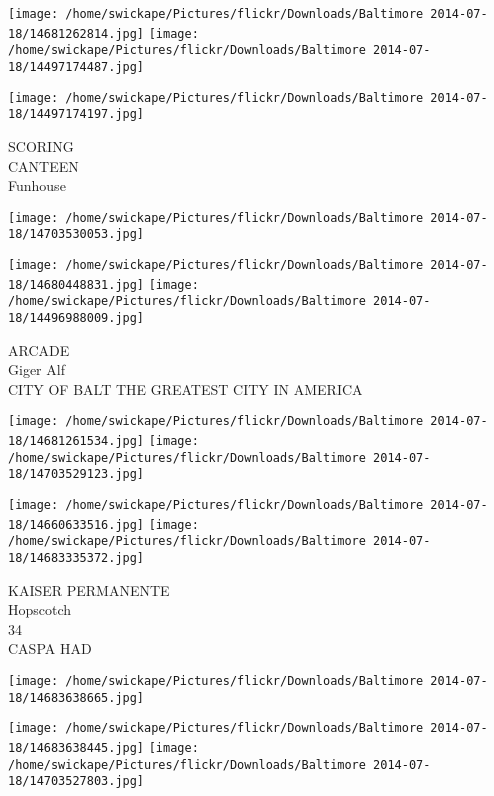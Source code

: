\documentclass[10pt,letterpaper]{article}
\begin{document}
\texttt{[image: /home/swickape/Pictures/flickr/Downloads/Baltimore 2014-07-18/14681262814.jpg]}
\texttt{[image: /home/swickape/Pictures/flickr/Downloads/Baltimore 2014-07-18/14497174487.jpg]}

\texttt{[image: /home/swickape/Pictures/flickr/Downloads/Baltimore 2014-07-18/14497174197.jpg]}

SCORING\\
CANTEEN\\
Funhouse\\
\pagebreak

\texttt{[image: /home/swickape/Pictures/flickr/Downloads/Baltimore 2014-07-18/14703530053.jpg]}

\vspace{0.25in}
\texttt{[image: /home/swickape/Pictures/flickr/Downloads/Baltimore 2014-07-18/14680448831.jpg]}
\texttt{[image: /home/swickape/Pictures/flickr/Downloads/Baltimore 2014-07-18/14496988009.jpg]}

ARCADE\\
Giger Alf\\
CITY OF BALT THE GREATEST CITY IN AMERICA\\
\pagebreak

\texttt{[image: /home/swickape/Pictures/flickr/Downloads/Baltimore 2014-07-18/14681261534.jpg]}
\texttt{[image: /home/swickape/Pictures/flickr/Downloads/Baltimore 2014-07-18/14703529123.jpg]}

\texttt{[image: /home/swickape/Pictures/flickr/Downloads/Baltimore 2014-07-18/14660633516.jpg]}
\texttt{[image: /home/swickape/Pictures/flickr/Downloads/Baltimore 2014-07-18/14683335372.jpg]}

KAISER PERMANENTE\\
Hopscotch\\
34\\
CASPA HAD\\
\pagebreak

\texttt{[image: /home/swickape/Pictures/flickr/Downloads/Baltimore 2014-07-18/14683638665.jpg]}

\vspace{0.25in}
\texttt{[image: /home/swickape/Pictures/flickr/Downloads/Baltimore 2014-07-18/14683638445.jpg]}
\texttt{[image: /home/swickape/Pictures/flickr/Downloads/Baltimore 2014-07-18/14703527803.jpg]}
\end{document}

